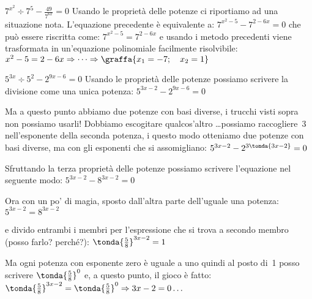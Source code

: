 \begin{esempio}
\(7^{x^2} \div 7^5 - \frac{49}{7^{6x}} = 0\) Usando le proprietà delle potenze 
ci riportiamo ad una situazione nota. 
L'equazione precedente è equivalente a: 
\(7^{x^2-5} - 7^{2-6x} = 0\) che può essere riscritta come:
\(7^{x^2-5} = 7^{2-6x}\) e usando i metodo precedenti viene 
trasformata in un'equazione polinomiale facilmente risolvibile:
\(x^2-5 = 2-6x \Rightarrow \dots \Rightarrow \graffa{x_1=-7;\quad x_2=1}\)
\end{esempio}

\begin{esempio}
\({5}^{3x} \div 5^2-{2}^{9x-6}=0\)
Usando le proprietà delle potenze possiamo scrivere la divisione come una 
unica potenza:
\({5}^{3x-2}-{2}^{9x-6}=0\)

Ma a questo punto abbiamo due potenze con basi diverse, i trucchi visti sopra 
non possiamo usarli! Dobbiamo escogitare qualcos'altro \dots possiamo 
raccogliere~3 nell'esponente della seconda potenza, i questo modo otteniamo due 
potenze con basi diverse, ma con gli esponenti che si assomigliano:
\({5}^{3x-2}-{2}^{3\tonda{3x-2}}=0\)

Sfruttando la terza proprietà delle potenze possiamo scrivere l'equazione nel 
seguente modo:
\({5}^{3x-2}-{8}^{3x-2}=0\)

Ora con un po' di magia, sposto dall'altra parte dell'uguale una potenza:
\({5}^{3x-2}={8}^{3x-2}\)

e divido entrambi i membri per l'espressione che si trova a secondo membro 
(posso farlo? perché?):
\(\tonda{\frac{5}{8}}^{3x-2}=1\)

Ma ogni potenza con esponente zero è uguale a uno quindi al posto di~1 posso 
scrivere \(\tonda{\frac{5}{8}}^{0}\) e, a questo punto, il gioco è fatto:
\(\tonda{\frac{5}{8}}^{3x-2}=\tonda{\frac{5}{8}}^{0} \Rightarrow 3x-2=0 \dots\) 
\end{esempio}

